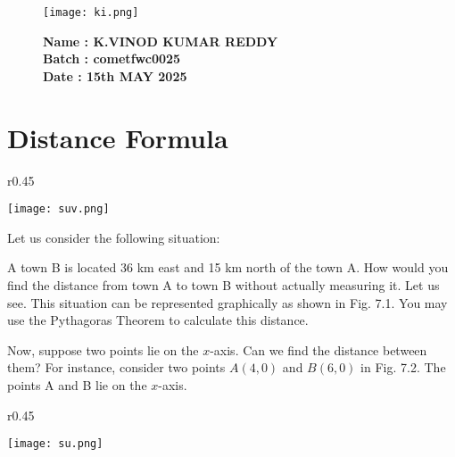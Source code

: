 \documentclass[12pt]{article}
\begin{document}
\begin{figure}[h!]
    \begin{minipage}{0.45\textwidth}  %
        \texttt{[image: ki.png]}  %
    \end{minipage} \hfill
    \begin{minipage}{0.45\textwidth}  %
        \textbf{Name : K.VINOD KUMAR REDDY} \\
    \textbf{Batch : cometfwc0025} \\
  \textbf{Date : 15th MAY 2025}
    \end{minipage}
\end{figure}
\setcounter{page}{156}

\section{\textcolor{ncertblue}{Distance Formula}}

\begin{wrapfigure}{r}{0.45\textwidth}
  \vspace{-20pt}
  \begin{center}
    \texttt{[image: suv.png]}
    \vspace{-10pt}
    
  \end{center}
  \vspace{-10pt}
\end{wrapfigure}

Let us consider the following situation:

A town B is located 36 km east and 15 km north of the town A. How would you find the distance from town A to town B without actually measuring it. Let us see. This situation can be represented graphically as shown in Fig. 7.1. You may use the Pythagoras Theorem to calculate this distance.

Now, suppose two points lie on the $x$-axis. Can we find the distance between them? For instance, consider two points $A(4, 0)$ and $B(6, 0)$ in Fig. 7.2. The points A and B lie on the $x$-axis.

\begin{wrapfigure}{r}{0.45\textwidth}
  \vspace{-20pt}
  \begin{center}
    \texttt{[image: su.png]}
    \vspace{-10pt}
    

  \end{center}
  \vspace{-10pt}
\end{wrapfigure}
\end{document}
